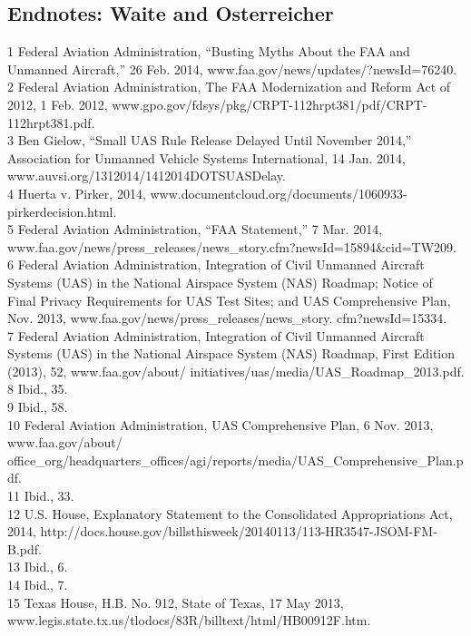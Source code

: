 \begin{itemize}
\section{Endnotes: Waite and Osterreicher}
1 Federal Aviation Administration, ``Busting Myths About the FAA and Unmanned Aircraft,'' 26 Feb.
2014, www.faa.gov/news/updates/?newsId=76240.\\
2 Federal Aviation Administration, The FAA Modernization and Reform Act of 2012, 1 Feb. 2012,
www.gpo.gov/fdsys/pkg/CRPT-112hrpt381/pdf/CRPT-112hrpt381.pdf.\\
3 Ben Gielow, ``Small UAS Rule Release Delayed Until November 2014,'' Association for Unmanned
Vehicle Systems International, 14 Jan. 2014, www.auvsi.org/1312014/1412014DOTSUASDelay.\\
4 Huerta v. Pirker, 2014, www.documentcloud.org/documents/1060933-pirkerdecision.html.\\
5 Federal Aviation Administration, ``FAA Statement,'' 7 Mar. 2014, www.faa.gov/news/press_releases/news_story.cfm?newsId=15894&cid=TW209.\\
6 Federal Aviation Administration, Integration of Civil Unmanned Aircraft Systems (UAS) in the
National Airspace System (NAS) Roadmap; Notice of Final Privacy Requirements for UAS Test
Sites; and UAS Comprehensive Plan, Nov. 2013, www.faa.gov/news/press_releases/news_story.
cfm?newsId=15334.\\
7 Federal Aviation Administration, Integration of Civil Unmanned Aircraft Systems (UAS) in
the National Airspace System (NAS) Roadmap, First Edition (2013), 52, www.faa.gov/about/
initiatives/uas/media/UAS_Roadmap_2013.pdf.\\
8 Ibid., 35.\\
9 Ibid., 58.\\
10 Federal Aviation Administration, UAS Comprehensive Plan, 6 Nov. 2013, www.faa.gov/about/
office_org/headquarters_offices/agi/reports/media/UAS_Comprehensive_Plan.pdf.\\
11 Ibid., 33.\\
12 U.S. House, Explanatory Statement to the Consolidated Appropriations Act, 2014,
http://docs.house.gov/billsthisweek/20140113/113-HR3547-JSOM-FM-B.pdf.\\
13 Ibid., 6.\\
14 Ibid., 7.\\
15 Texas House, H.B. No. 912, State of Texas, 17 May 2013,
www.legis.state.tx.us/tlodocs/83R/billtext/html/HB00912F.htm.\\

\end{itemize}
